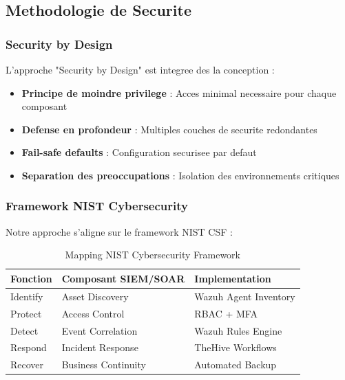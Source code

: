 \subsection{Methodologie de Securite}

\subsubsection{Security by Design}

L'approche "Security by Design" est integree des la conception :

\begin{itemize}
    \item \textbf{Principe de moindre privilege} : Acces minimal necessaire pour chaque composant
    \item \textbf{Defense en profondeur} : Multiples couches de securite redondantes
    \item \textbf{Fail-safe defaults} : Configuration securisee par defaut
    \item \textbf{Separation des preoccupations} : Isolation des environnements critiques
\end{itemize}

\subsubsection{Framework NIST Cybersecurity}

Notre approche s'aligne sur le framework NIST CSF :

\begin{table}[H]
    \centering
    \caption{Mapping NIST Cybersecurity Framework}
    \begin{tabular}{|l|l|l|}
        \hline
        \textbf{Fonction} & \textbf{Composant SIEM/SOAR} & \textbf{Implementation} \\
        \hline
        Identify          & Asset Discovery              & Wazuh Agent Inventory   \\
        \hline
        Protect           & Access Control               & RBAC + MFA              \\
        \hline
        Detect            & Event Correlation            & Wazuh Rules Engine      \\
        \hline
        Respond           & Incident Response            & TheHive Workflows       \\
        \hline
        Recover           & Business Continuity          & Automated Backup        \\
        \hline
    \end{tabular}
\end{table}

